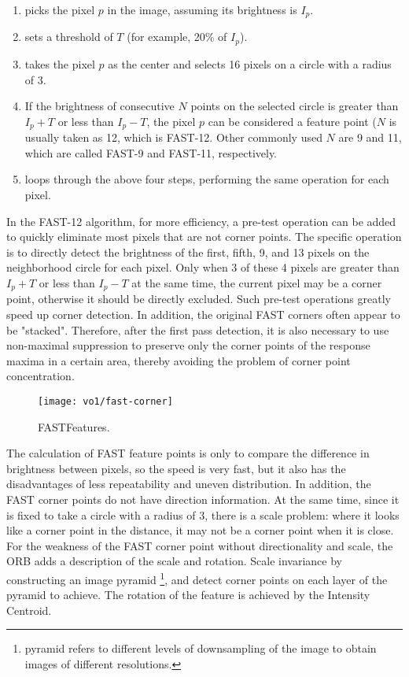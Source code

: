 \begin{enumerate}
\item picks the pixel $p$ in the image, assuming its brightness is $I_{p}$.
\item sets a threshold of $T$ (for example, 20\% of $I_{p}$).
\item takes the pixel $p$ as the center and selects 16 pixels on a circle with a radius of 3.
\item If the brightness of consecutive $N$ points on the selected circle is greater than $I_{p}+T$ or less than $I_{p}-T$, the pixel $p$ can be considered a feature point ($ N$ is usually taken as 12, which is FAST-12. Other commonly used $N$ are 9 and 11, which are called FAST-9 and FAST-11, respectively.
\item loops through the above four steps, performing the same operation for each pixel.
\end{enumerate}
In the FAST-12 algorithm, for more efficiency, a pre-test operation can be added to quickly eliminate most pixels that are not corner points. The specific operation is to directly detect the brightness of the first, fifth, 9, and 13 pixels on the neighborhood circle for each pixel. Only when 3 of these 4 pixels are greater than $I_{p}+T$ or less than $I_{p}-T$ at the same time, the current pixel may be a corner point, otherwise it should be directly excluded. Such pre-test operations greatly speed up corner detection. In addition, the original FAST corners often appear to be "stacked". Therefore, after the first pass detection, it is also necessary to use non-maximal suppression to preserve only the corner points of the response maxima in a certain area, thereby avoiding the problem of corner point concentration.

\begin{figure}[!ht]
\centering
\texttt{[image: vo1/fast-corner]}
\caption{FASTFeatures\textsuperscript{\cite{Rosten2006}}. }
\label{fig:fastcorner}
\end{figure}

The calculation of FAST feature points is only to compare the difference in brightness between pixels, so the speed is very fast, but it also has the disadvantages of less repeatability and uneven distribution. In addition, the FAST corner points do not have direction information. At the same time, since it is fixed to take a circle with a radius of 3, there is a scale problem: where it looks like a corner point in the distance, it may not be a corner point when it is close. For the weakness of the FAST corner point without directionality and scale, the ORB adds a description of the scale and rotation. Scale invariance by constructing an image pyramid \footnote{pyramid refers to different levels of downsampling of the image to obtain images of different resolutions. }, and detect corner points on each layer of the pyramid to achieve. The rotation of the feature is achieved by the Intensity Centroid.

